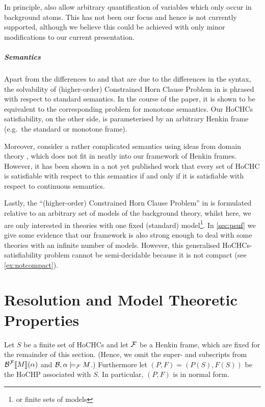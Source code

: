 \documentclass[a4paper,twoside,notitlepage,openright,11pt]{report}
\begin{document}
In principle, \cite{BOR18} also allow arbitrary quantification of variables which only occur in background atoms. This has not been our focus and hence is not currently supported, although we believe this could be achieved with only minor modifications to our current presentation.


\paragraph{Semantics}
Apart from the differences to \cite{BOR18} and \cite{CHRW13} that are due to the differences in the syntax, the solvability of (higher-order) Constrained Horn Clause Problem in \cite{BOR18} is phrased with respect to standard semantics. In the course of the paper, it is shown to be equivalent to the corresponding problem for monotone semantics. Our HoCHCs satisfiability, on the other side, is parameterised by an arbitrary Henkin frame (e.g.\ the standard or monotone frame).

Moreover, \cite{CHRW13} consider a rather complicated semantics using ideas from domain theory \cite{AJ95}, which does not fit in neatly into our framework of Henkin frames. However, it has been shown in a not yet published work \cite{J18} that every set of HoCHC is satisfiable with respect to this semantics if and only if it is satisfiable with respect to continuous semantics.

Lastly, the ``(higher-order) Constrained Horn Clause Problem'' in \cite{BOR18} is formulated relative to an arbitrary set of models of the background theory, whilst here, we are only interested in theories with one fixed (standard) model\footnote{or finite sets of models}. In \cref{sec:peuf} we give some evidence that our framework is also strong enough to deal with some theories with an infinite number of models.  However, this generalised HoCHCs-satisfiability problem cannot be semi-decidable because it is not compact (see \cref{ex:notcompact}).


\chapter{Resolution and Model Theoretic Properties}
\label{ch:res}
\label{CH:RES}
Let $S$ be a finite set of HoCHCs and let $\mathcal F$ be a Henkin frame, which are fixed for the remainder of this section. (Hence, we omit the super- and subscripts from ${\mathcal B}^\mathcal F\llbracket M\rrbracket(\alpha)$ and $\mathcal B,\alpha\models_\mathcal F M$.) Furthermore let $(P,F)=(P(S),F(S))$ be the HoCHP associated with $S$. In particular, $(P,F)$ is in normal form.
\end{document}
